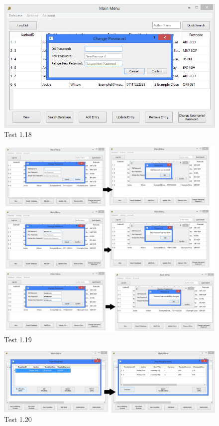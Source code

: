 \begin{landscape}
\begin{figure}[H]
    \includegraphics[width=\textwidth]{./Testing/Evidence/ChangePasswordButtonTest.png}
    \caption{Test 1.18}  \label{fig:ChangePasswordButtonTest}
\end{figure}

\begin{figure}[H]
    \includegraphics[width=\textwidth]{./Testing/Evidence/ConfirmPasswordButtonTest.png}
    \caption{Test 1.19}  \label{fig:ConfirmPasswordButtonTest}
\end{figure}

\begin{figure}[H]
    \includegraphics[width=\textwidth]{./Testing/Evidence/ViewRoyaltyItemsButtonTest.png}
    \caption{Test 1.20}  \label{fig:ViewRoyaltyItemsButtonTest}
\end{figure}


\end{landscape}
